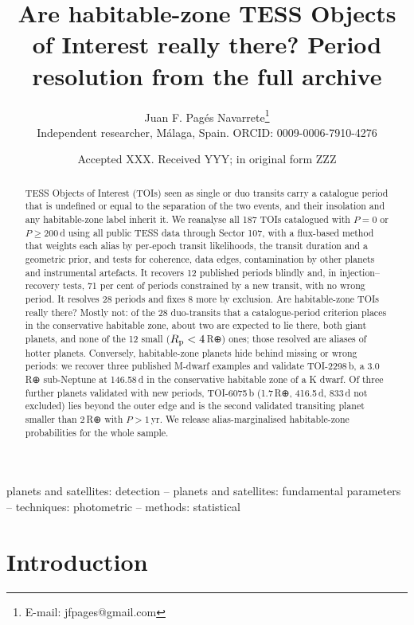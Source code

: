\documentclass[fleqn,usenatbib]{mnras}
\title[Are habitable-zone TOIs really there?]{Are habitable-zone TESS Objects of Interest really there? Period resolution from the full archive}
\author[J. F. Pagés Navarrete]{Juan F. Pagés Navarrete\thanks{E-mail: jfpages@gmail.com}
\\
Independent researcher, Málaga, Spain. ORCID: 0009-0006-7910-4276}
\date{Accepted XXX. Received YYY; in original form ZZZ}
\newcommand{\Rp}{\ensuremath{R_{\rm p}}}
\begin{document}
\label{firstpage}
\pagerange{\pageref{firstpage}--\pageref{lastpage}}
\maketitle

\begin{abstract}
TESS Objects of Interest (TOIs) seen as single or duo transits carry a catalogue period that is undefined or equal to the separation of the two events, and their insolation and any habitable-zone label inherit it. We reanalyse all 187 TOIs catalogued with $P = 0$ or $P \geq 200$\,d using all public TESS data through Sector 107, with a flux-based method that weights each alias by per-epoch transit likelihoods, the transit duration and a geometric prior, and tests for coherence, data edges, contamination by other planets and instrumental artefacts. It recovers 12 published periods blindly and, in injection--recovery tests, 71 per cent of periods constrained by a new transit, with no wrong period. It resolves 28 periods and fixes 8 more by exclusion. Are habitable-zone TOIs really there? Mostly not: of the 28 duo-transits that a catalogue-period criterion places in the conservative habitable zone, about two are expected to lie there, both giant planets, and none of the 12 small ($\Rp < 4$\,R⊕) ones; those resolved are aliases of hotter planets. Conversely, habitable-zone planets hide behind missing or wrong periods: we recover three published M-dwarf examples and validate TOI-2298\,b, a 3.0\,R⊕ sub-Neptune at 146.58\,d in the conservative habitable zone of a K dwarf. Of three further planets validated with new periods, TOI-6075\,b (1.7\,R⊕, 416.5\,d, 833\,d not excluded) lies beyond the outer edge and is the second validated transiting planet smaller than 2\,R⊕ with $P > 1$\,yr. We release alias-marginalised habitable-zone probabilities for the whole sample.
\end{abstract}

\begin{keywords}
planets and satellites: detection -- planets and satellites: fundamental parameters -- techniques: photometric -- methods: statistical
\end{keywords}

\section{Introduction}
\end{document}
